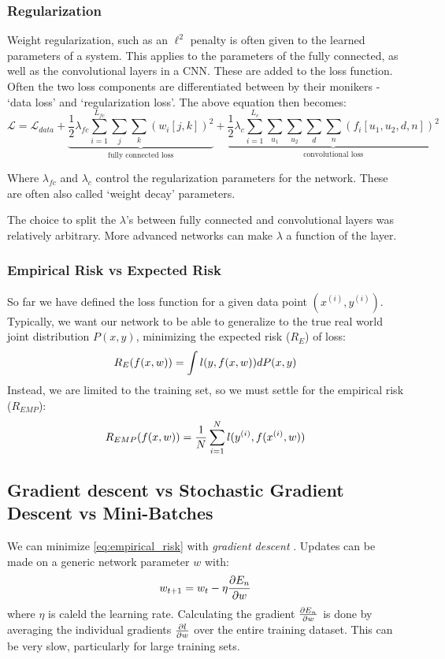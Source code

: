 \subsubsection{Regularization}
  Weight regularization, such as an $\ell^2$ penalty is often given to the
  learned parameters of a system. This applies to the parameters of the fully
  connected, as well as the convolutional layers in a CNN\@. These are added to
  the loss function. Often the two loss components are differentiated between by
  their monikers - `data loss' and `regularization loss'. The above 
  equation then becomes:
  \begin{equation}
    \mathcal{L} = \mathcal{L}_{data} + \underbrace{\frac{1}{2}\lambda_{fc}
    \sum_{i=1}^{L_{fc}} \sum_{j} \sum_{k} {(w_{i}[j,k])}^2}_{\text{fully connected
    loss}} +
    \underbrace{\frac{1}{2}\lambda_{c} \sum_{i=1}^{L_c} \sum_{u_1} \sum_{u_2} \sum_{d}
    \sum_{n} \left(f_i[u_1,u_2,d,n]\right)^2}_{\text{convolutional loss}}
  \end{equation}

  Where $\lambda_{fc}$ and $\lambda_{c}$ control the regularization parameters
  for the network. These are often also called `weight decay' parameters.

  The choice to split the $\lambda$'s between fully connected and convolutional
  layers was relatively arbitrary. More advanced networks can make $\lambda$
  a function of the layer. 

\subsubsection{Empirical Risk vs Expected Risk}
  So far we have defined the loss function for a given data point $(x^{(i)},
  y^{(i)})$. Typically, we want our network to be able to generalize to the
  true real world joint distribution $P(x,y)$, minimizing the expected risk ($R_E$) of
  loss:
  \begin{equation}
    R_E(f(x,w)) = \int l(y,f(x,w)) dP(x,y)
  \end{equation}
  Instead, we are limited to the training set, so we must settle for the
  empirical risk ($R_{EMP}$):
  \begin{equation}
    R_{EMP}(f(x,w)) = \frac{1}{N} \sum_{i=1}^{N} l( y^{(i)},f(x^{(i)}, w))
    \label{eq:empirical_risk}
  \end{equation}

\subsection{Gradient descent vs Stochastic Gradient Descent vs Mini-Batches}
  We can minimize \autoref{eq:empirical_risk} with \emph{gradient descent}
  \citep{rumelhart_parallel_1986}. Updates can be made on a generic network
  parameter $w$ with:
  \begin{equation}
    w_{t+1} = w_{t} - \eta \frac{\partial E_n}{\partial w}
  \end{equation}
  where $\eta$ is caleld the learning rate. Calculating the gradient
  $\frac{\partial E_n}{\partial w}$ is done by averaging the individual gradients
  $\frac{\partial l}{\partial w}$ over the entire training dataset. This can be very slow,
  particularly for large training sets.
  
